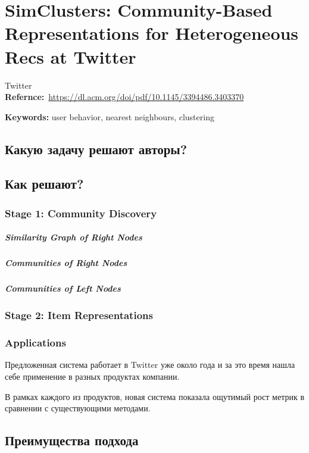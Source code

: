 \chapter{SimClusters: Community-Based Representations for Heterogeneous Recs at Twitter}

Twitter \\

\textbf{Refernce:}~\url{https://dl.acm.org/doi/pdf/10.1145/3394486.3403370}

\textbf{Keywords:} user behavior, nearest neighbours, clustering

\section*{Какую задачу решают авторы?}

\section*{Как решают?}

\subsection*{Stage 1: Community Discovery}

\paragraph{Similarity Graph of Right Nodes}

\paragraph{Communities of Right Nodes}

\paragraph{Communities of Left Nodes}

\subsection*{Stage 2: Item Representations}

\subsection*{Applications}

Предложенная система работает в Twitter уже около года и за это время нашла себе применение в разных продуктах компании.

В рамках каждого из продуктов, новая система показала ощутимый рост метрик в сравнении с существующими методами.

\section*{Преимущества подхода}


